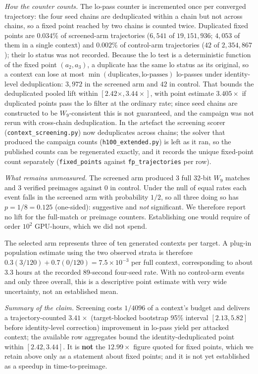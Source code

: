 \documentclass[11pt,a4paper]{article}
\begin{document}
\emph{How the counter counts.}  The lo-pass counter is incremented once per converged trajectory: the four seed chains are deduplicated within a chain but not across chains, so a fixed point reached by two chains is counted twice.  Duplicated fixed points are $0.034\%$ of screened-arm trajectories ($6{,}541$ of $19{,}151{,}936$; $4{,}053$ of them in a single context) and $0.002\%$ of control-arm trajectories ($42$ of $2{,}354{,}867$); their lo status was not recorded.  Because the lo test is a deterministic function of the fixed point $(a_2,a_3)$, a duplicate has the same lo status as its original, so a context can lose at most $\min(\text{duplicates},\text{lo-passes})$ lo-passes under identity-level deduplication: $3{,}972$ in the screened arm and $42$ in control.  That bounds the deduplicated pooled lift within $[2.42\times, 3.44\times]$, with point estimate $3.405\times$ if duplicated points pass the lo filter at the ordinary rate; since seed chains are constructed to be $W_9$-consistent this is not guaranteed, and the campaign was not rerun with cross-chain deduplication.  In the artefact the screening scorer (\texttt{context\_screening.py}) now deduplicates across chains; the solver that produced the campaign counts (\texttt{h100\_extended.py}) is left as it ran, so the published counts can be regenerated exactly, and it records the unique fixed-point count separately (\texttt{fixed\_points} against \texttt{fp\_trajectories} per row).

\emph{What remains unmeasured.}  The screened arm produced 3 full 32-bit $W_9$
matches and 3 verified preimages against 0 in control.  Under the null of
equal rates each event falls in the screened arm with probability $1/2$,
so all three doing so has $p = 1/8 = 0.125$ (one-sided): suggestive and
\emph{not} significant.  We therefore
report no lift for the full-match or preimage counters.  Establishing one would
require of order $10^2$ GPU-hours, which we did not spend.

The selected arm represents three of ten generated contexts per target.  A
plug-in population estimate using the two observed strata is therefore
$0.3(3/120)+0.7(0/120)=7.5\times10^{-3}$ per full context, corresponding to
about 3.3 hours at the recorded 89-second four-seed rate.  With no control-arm
events and only three overall, this is a descriptive point estimate with very
wide uncertainty, not an established mean.

\emph{Summary of the claim.}  Screening costs $1/4096$ of a context's budget
and delivers a trajectory-counted $3.41\times$ (target-blocked bootstrap 95\%
interval $[2.13, 5.82]$ before identity-level correction) improvement in
lo-pass yield per attacked context; the available row aggregates bound the
identity-deduplicated point within $[2.42,3.44]$.  It is \textbf{not} the $12.99\times$
figure quoted for fixed points, which we retain above only as a statement about
fixed points; and it is not yet established as a speedup in time-to-preimage.
\end{document}
